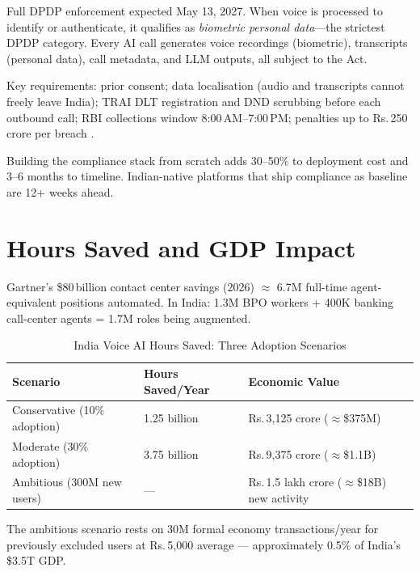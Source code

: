 \documentclass[12pt,a4paper]{article}
\begin{document}
Full DPDP enforcement expected May 13, 2027.  When voice is processed to
identify or authenticate, it qualifies as \emph{biometric personal
data}---the strictest DPDP category.  Every AI call generates voice
recordings (biometric), transcripts (personal data), call metadata, and LLM
outputs, all subject to the Act.

Key requirements: prior consent; data localisation (audio and transcripts
cannot freely leave India); TRAI DLT registration and DND scrubbing before
each outbound call; RBI collections window 8:00\,AM--7:00\,PM; penalties up
to Rs.\,250\,crore per breach \cite{callerdigital-dpdp}.

Building the compliance stack from scratch adds 30--50\% to deployment cost
and 3--6 months to timeline.  Indian-native platforms that ship compliance
as baseline are 12+ weeks ahead.

\section{Hours Saved and GDP Impact}
\label{sec:gdp}

Gartner's \$80\,billion contact center savings (2026) $\approx$ 6.7M
full-time agent-equivalent positions automated.  In India: 1.3M BPO workers
+ 400K banking call-center agents = 1.7M roles being augmented.

\begin{table}[H]\centering
\caption{India Voice AI Hours Saved: Three Adoption Scenarios}
\label{tab:hours-saved}
\begin{tabularx}{\textwidth}{llX}
\toprule
\textbf{Scenario} & \textbf{Hours Saved/Year} & \textbf{Economic Value} \\
\midrule
Conservative (10\% adoption) & 1.25 billion & Rs.\,3{,}125 crore ($\approx$\$375M) \\
Moderate (30\% adoption)     & 3.75 billion & Rs.\,9{,}375 crore ($\approx$\$1.1B) \\
Ambitious (300M new users)   & ---          & Rs.\,1.5 lakh crore ($\approx$\$18B) new activity \\
\bottomrule
\end{tabularx}
\end{table}

The ambitious scenario rests on 30M formal economy transactions/year for
previously excluded users at Rs.\,5{,}000 average --- approximately 0.5\%
of India's \$3.5T GDP.
\end{document}
